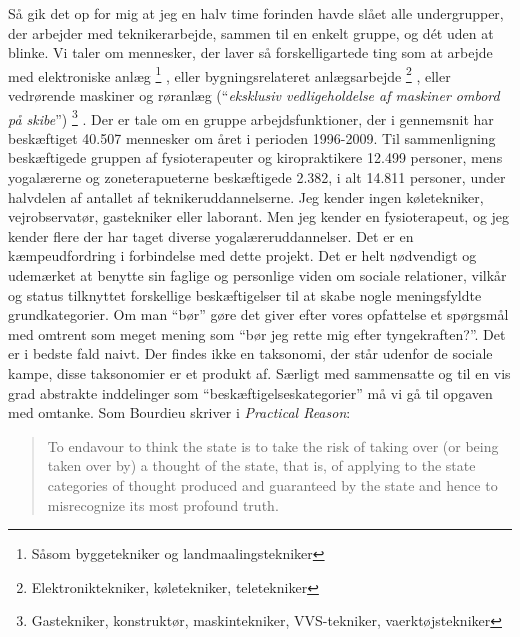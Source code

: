 Så gik det op for mig at jeg en halv time forinden havde slået alle undergrupper, der arbejder med teknikerarbejde, sammen til en enkelt gruppe, og dét uden at blinke. Vi taler om mennesker, der laver så forskelligartede ting som at arbejde med elektroniske anlæg%
%
\footnote{Såsom byggetekniker og landmaalingstekniker}%
%
, eller bygningsrelateret anlægsarbejde%
%
\footnote{Elektroniktekniker, køletekniker, teletekniker}%
%
, eller vedrørende maskiner og røranlæg (“\emph{eksklusiv vedligeholdelse af maskiner ombord på skibe}”)%
%
\footnote{Gastekniker, konstruktør, maskintekniker, VVS-tekniker, vaerktøjstekniker
}%
%
. Der er tale om en gruppe arbejdsfunktioner, der i gennemsnit har beskæftiget 40.507 mennesker om året i perioden 1996-2009. Til sammenligning beskæftigede gruppen af fysioterapeuter og kiropraktikere 12.499 personer, mens yogalærerne og zoneterapueterne beskæftigede 2.382, i alt 14.811 personer, under halvdelen af antallet af teknikeruddannelserne. Jeg kender ingen køletekniker, vejrobservatør, gastekniker eller laborant. Men jeg kender en fysioterapeut, og jeg kender flere der har taget diverse yogalæreruddannelser. Det er en kæmpeudfordring i forbindelse med dette projekt. Det er helt nødvendigt og udemærket at benytte sin faglige og personlige viden om sociale relationer, vilkår og status tilknyttet forskellige beskæftigelser til at skabe nogle meningsfyldte grundkategorier. Om man “bør” gøre det giver efter vores opfattelse et spørgsmål med omtrent som meget mening som “bør jeg rette mig efter tyngekraften?”. Det er i bedste fald naivt. Der findes ikke en taksonomi, der står udenfor de sociale kampe, disse taksonomier er et produkt af. Særligt med sammensatte og til en vis grad abstrakte inddelinger som “beskæftigelseskategorier” må vi gå til opgaven med omtanke. Som Bourdieu skriver i \emph{Practical Reason}:

%
 \begin{quote} \small %
	To endavour to think the state is to take the risk of taking over (or being taken over by) a thought of the state, that is, of applying to the state categories of thought produced and 	guaranteed by the state and hence to misrecognize its most profound truth. 
 \end{quote}

